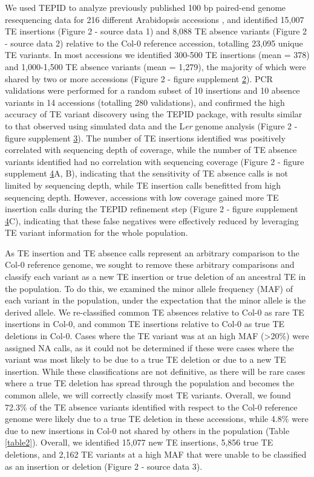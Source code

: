\documentclass[12pt]{article}
\begin{document}
We used TEPID to analyze previously published 100 bp paired-end genome
resequencing data for 216 different Arabidopsis accessions
\cite{Schmitz:2013iu}, and identified 15,007 TE insertions (Figure 2 -
source data 1) and 8,088 TE absence variants (Figure 2 - source data
2) relative to the Col-0 reference accession, totalling 23,095 unique
TE variants. In most accessions we identified 300-500 TE insertions
(mean = 378) and 1,000-1,500 TE absence variants (mean = 1,279), the
majority of which were shared by two or more accessions (Figure 2 -
figure supplement \hyperref[fig2s2]{2}). PCR validations were
performed for a random subset of 10 insertions and 10 absence variants
in 14 accessions (totalling 280 validations), and confirmed the high
accuracy of TE variant discovery using the TEPID package, with results
similar to that observed using simulated data and the L\emph{er}
genome analysis (Figure 2 - figure supplement
\hyperref[fig2s3]{3}). The number of TE insertions identified was
positively correlated with sequencing depth of coverage, while the
number of TE absence variants identified had no correlation with
sequencing coverage (Figure 2 - figure supplement
\hyperref[fig2s4]{4}A, B), indicating that the sensitivity of TE
absence calls is not limited by sequencing depth, while TE insertion
calls benefitted from high sequencing depth.  However, accessions with
low coverage gained more TE insertion calls during the TEPID
refinement step (Figure 2 - figure supplement \hyperref[fig2s4]{4}C),
indicating that these false negatives were effectively reduced by
leveraging TE variant information for the whole population.

As TE insertion and TE absence calls represent an arbitrary comparison
to the Col-0 reference genome, we sought to remove these arbitrary
comparisons and classify each variant as a new TE insertion or true
deletion of an ancestral TE in the population. To do this, we examined
the minor allele frequency (MAF) of each variant in the population,
under the expectation that the minor allele is the derived allele. We
re-classified common TE absences relative to Col-0 as rare TE
insertions in Col-0, and common TE insertions relative to Col-0 as
true TE deletions in Col-0. Cases where the TE variant was at an high
MAF (\textgreater{}20\%) were assigned NA calls, as it could not be
determined if these were cases where the variant was most likely to be
due to a true TE deletion or due to a new TE insertion. While these
classifications are not definitive, as there will be rare cases where
a true TE deletion has spread through the population and becomes the
common allele, we will correctly classify most TE variants. Overall,
we found 72.3\% of the TE absence variants identified with respect to
the Col-0 reference genome were likely due to a true TE deletion in
these accessions, while 4.8\% were due to new insertions in Col-0 not
shared by others in the population (Table \ref{table2}). Overall, we
identified 15,077 new TE insertions, 5,856 true TE deletions, and
2,162 TE variants at a high MAF that were unable to be classified as
an insertion or deletion (Figure 2 - source data 3).
\end{document}
